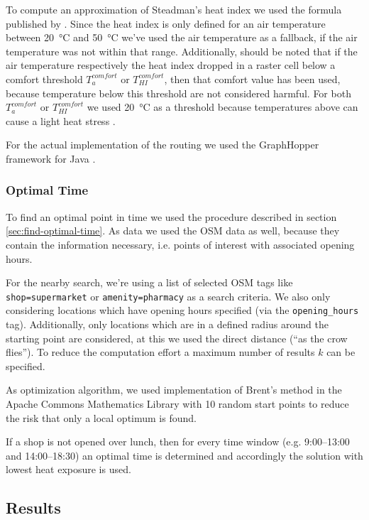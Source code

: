 To compute an approximation of Steadman's heat index we used the formula published by \textcite[77]{Stull2011}. Since the heat index is only defined for an air temperature between \SI{20}{\celsius} and \SI{50}{\celsius} we've used the air temperature as a fallback, if the air temperature was not within that range. Additionally, should be noted that if the air temperature respectively the heat index dropped in a raster cell below a comfort threshold $T_a^{comfort}$ or $T_{HI}^{comfort}$, then that comfort value has been used, because temperature below this threshold are not considered harmful. For both  $T_a^{comfort}$ or $T_{HI}^{comfort}$ we used \SI{20}{\celsius} as a threshold because temperatures above can cause a light heat stress \parencite{Staiger2011}.

For the actual implementation of the routing we used the GraphHopper framework for Java \parencite{GraphHopper2016,GraphHopper2016a}.

\subsubsection{Optimal Time}

To find an optimal point in time we used the procedure described in section \ref{sec:find-optimal-time}. As data we used the OSM data as well, because they contain the information necessary, i.e. points of interest with associated opening hours. 

For the nearby search,  we're using a list of selected OSM tags like \verb|shop=supermarket| or \verb|amenity=pharmacy| as a search criteria. We also only considering locations which have opening hours specified (via the \verb|opening_hours| tag). Additionally, only locations which are in a defined radius around the starting point are considered, at this we used the direct distance (“as the crow flies”). To reduce the computation effort a maximum number of results $k$ can be specified.

As optimization algorithm, we used implementation of Brent's method in the Apache Commons Mathematics Library \parencite{ASF2016} with 10 random start points to reduce the risk that only a local optimum is found.

If a shop is not opened over lunch, then for every time window (e.g. 9:00--13:00 and 14:00--18:30) an optimal time is determined and accordingly the solution with lowest heat exposure is used.

\subsection{Results}

